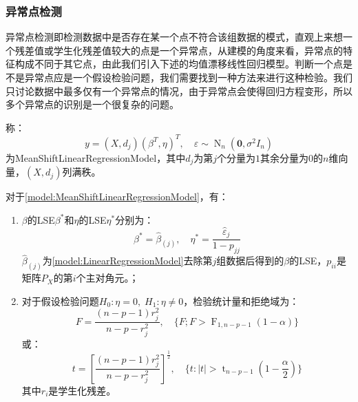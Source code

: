 \subsubsection{异常点检测}
\begin{note}
	异常点检测即检测数据中是否存在某一个点不符合该组数据的模式，直观上来想一个残差值或学生化残差值较大的点是一个异常点，从建模的角度来看，异常点的特征构成不同于其它点，由此我们引入下述的均值漂移线性回归模型。判断一个点是不是异常点应是一个假设检验问题，我们需要找到一种方法来进行这种检验。我们只讨论数据中最多仅有一个异常点的情况，由于异常点会使得回归方程变形，所以多个异常点的识别是一个很复杂的问题。
\end{note}
\begin{definition}\label{model:MeanShiftLinearRegressionModel}
	称：
	\begin{equation*}
		y=(X,d_j)(\beta^T,\eta)^T,\quad\varepsilon\sim\operatorname{N}_n(\mathbf{0},\sigma^2I_n)
	\end{equation*}
	为\gls{MeanShiftLinearRegressionModel}，其中$d_j$为第$j$个分量为$1$其余分量为$0$的$n$维向量，$(X,d_j)$列满秩。
\end{definition}
\begin{theorem}\label{theo:MeanShiftLinearRegressionModel}
	对于\cref{model:MeanShiftLinearRegressionModel}，有：
	\begin{enumerate}
		\item $\beta$的LSE$\beta^*$和$\eta$的LSE$\eta^*$分别为：
		\begin{equation*}
			\beta^*=\hat{\beta}_{(j)},\quad\eta^*=\frac{\hat{\varepsilon}_j}{1-p_{jj}}
		\end{equation*}
		$\hat{\beta}_{(j)}$为\cref{model:LinearRegressionModel}去除第$j$组数据后得到的$\beta$的LSE，$p_{ii}$是矩阵$P_X$的第$i$个主对角元。；
		\item 对于假设检验问题$H_0:\eta=0,\;H_1:\eta\ne0$，检验统计量和拒绝域为：
		\begin{equation*}
			F=\frac{(n-p-1)r_j^2}{n-p-r_j^2},\quad\{F;F>\operatorname{F}_{1,n-p-1}(1-\alpha)\}
		\end{equation*}
		或：
		\begin{equation*}
			t=\left[\frac{(n-p-1)r_j^2}{n-p-r_j^2}\right]^{\frac{1}{2}},\quad\{t:|t|>\operatorname{t}_{n-p-1}\left(1-\frac{\alpha}{2}\right)\}
		\end{equation*}
		其中$r_i$是学生化残差。
	\end{enumerate}
\end{theorem}
